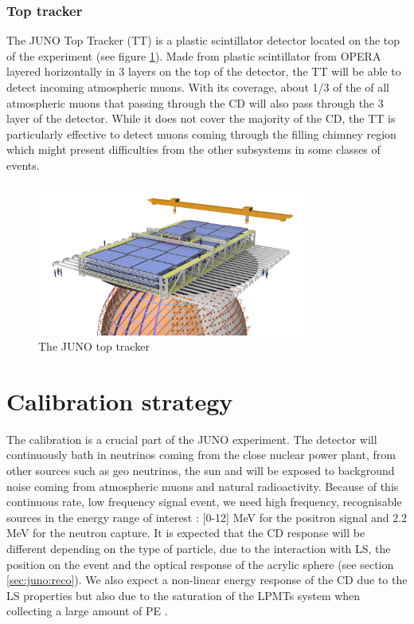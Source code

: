 \documentclass[../main.tex]{subfiles}
\begin{document}
\subsubsection{Top tracker}
The JUNO Top Tracker (TT) is a plastic scintillator detector located on the top of the experiment (see figure \ref{fig:juno:tt}). Made from plastic scintillator from OPERA \cite{acquafredda_opera_2009} layered horizontally in 3 layers on the top of the detector, the TT will be able to detect incoming atmospheric muons.
With its coverage, about 1/3 of the of all atmospheric muons that passing through the CD will also pass through the 3 layer of the detector. While it does not cover the majority of the CD, the TT is particularly effective to detect muons coming through the filling chimney region which might present difficulties from the other subsystems in some classes of events.
\begin{figure}[ht]
  \centering
  \includegraphics[height=5cm]{images/juno/Global_TT_01.png}
  \caption{The JUNO top tracker}
  \label{fig:juno:tt}
\end{figure}

\section{Calibration strategy}
\label{sec:juno:calib}

The calibration is a crucial part of the JUNO experiment. The detector will continuously bath in neutrinos coming from the close nuclear power plant, from other sources such as geo neutrinos, the sun and will be exposed to background noise coming from atmospheric muons and natural radioactivity.
Because of this continuous rate, low frequency signal event, we need high frequency, recognisable sources in the energy range of interest : [0-12] MeV for the positron signal and 2.2 MeV for the neutron capture.
It is expected that the CD response will be different depending on the type of particle, due to the interaction with LS, the position on the event and the optical response of the acrylic sphere (see section \ref{sec:juno:reco}).
We also expect a non-linear energy response of the CD due to the LS properties \cite{bay_optimization_2020} but also due to the saturation of the LPMTs system when collecting a large amount of PE \cite{han_dual_2021}.
\end{document}
